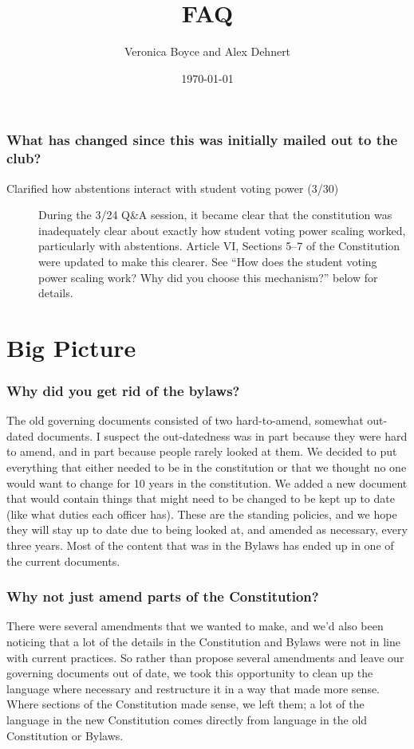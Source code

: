 \documentclass{article}
\title{FAQ}
\author{Veronica Boyce and Alex Dehnert}
\date{\today}
\begin{document}
\maketitle

\subsubsection*{What has changed since this was initially mailed out to the club?}
\begin{description}
\item[Clarified how abstentions interact with student voting power (3/30)] During the 3/24 Q\&A session, it became clear that the constitution was inadequately clear about exactly how student voting power scaling worked, particularly with abstentions. Article VI, Sections 5--7 of the Constitution were updated to make this clearer. See ``How does the student voting power scaling work? Why did you choose this mechanism?'' below for details.
\end{description}

\section{Big Picture}

\subsubsection*{Why did you get rid of the bylaws?}
The old governing documents consisted of two hard-to-amend, somewhat out-dated documents. I suspect the out-datedness was in part because they were hard to amend, and in part because people rarely looked at them. We decided to put everything that either needed to be in the constitution or that we thought no one would want to change for 10 years in the constitution. We added a new document that would contain things that might need to be changed to be kept up to date (like what duties each officer has). These are the standing policies, and we hope they will stay up to date due to being looked at, and amended as necessary, every three years. Most of the content that was in the Bylaws has ended up in one of the current documents.

\subsubsection*{Why not just amend parts of the Constitution?}
There were several amendments that we wanted to make, and we'd also been noticing that a lot of the details in the Constitution and Bylaws were not in line with current practices. So rather than propose several amendments and leave our governing documents out of date, we took this opportunity to clean up the language where necessary and restructure it in a way that made more sense. Where sections of the Constitution made sense, we left them; a lot of the language in the new Constitution comes directly from language in the old Constitution or Bylaws.
\end{document}

